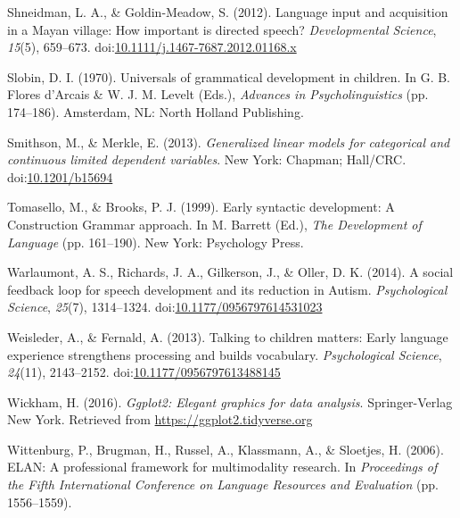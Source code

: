 \documentclass[,man,floatsintext]{apa6}
\begin{document}
\hypertarget{ref-shneidman2012language}{}
Shneidman, L. A., \& Goldin-Meadow, S. (2012). Language input and
acquisition in a Mayan village: How important is directed speech?
\emph{Developmental Science}, \emph{15}(5), 659--673.
doi:\href{https://doi.org/10.1111/j.1467-7687.2012.01168.x}{10.1111/j.1467-7687.2012.01168.x}

\hypertarget{ref-slobin1970universals}{}
Slobin, D. I. (1970). Universals of grammatical development in children.
In G. B. Flores d'Arcais \& W. J. M. Levelt (Eds.), \emph{Advances in
Psycholinguistics} (pp. 174--186). Amsterdam, NL: North Holland
Publishing.

\hypertarget{ref-smithson2013generalized}{}
Smithson, M., \& Merkle, E. (2013). \emph{Generalized linear models for
categorical and continuous limited dependent variables}. New York:
Chapman; Hall/CRC.
doi:\href{https://doi.org/10.1201/b15694}{10.1201/b15694}

\hypertarget{ref-tomasello1999early}{}
Tomasello, M., \& Brooks, P. J. (1999). Early syntactic development: A
Construction Grammar approach. In M. Barrett (Ed.), \emph{The
Development of Language} (pp. 161--190). New York: Psychology Press.

\hypertarget{ref-warlaumont2014social}{}
Warlaumont, A. S., Richards, J. A., Gilkerson, J., \& Oller, D. K.
(2014). A social feedback loop for speech development and its reduction
in Autism. \emph{Psychological Science}, \emph{25}(7), 1314--1324.
doi:\href{https://doi.org/10.1177/0956797614531023}{10.1177/0956797614531023}

\hypertarget{ref-weisleder2013talking}{}
Weisleder, A., \& Fernald, A. (2013). Talking to children matters: Early
language experience strengthens processing and builds vocabulary.
\emph{Psychological Science}, \emph{24}(11), 2143--2152.
doi:\href{https://doi.org/10.1177/0956797613488145}{10.1177/0956797613488145}

\hypertarget{ref-R-ggplot2}{}
Wickham, H. (2016). \emph{Ggplot2: Elegant graphics for data analysis}.
Springer-Verlag New York. Retrieved from
\url{https://ggplot2.tidyverse.org}

\hypertarget{ref-ELAN}{}
Wittenburg, P., Brugman, H., Russel, A., Klassmann, A., \& Sloetjes, H.
(2006). ELAN: A professional framework for multimodality research. In
\emph{Proceedings of the Fifth International Conference on Language
Resources and Evaluation} (pp. 1556--1559).

\endgroup
\end{document}
